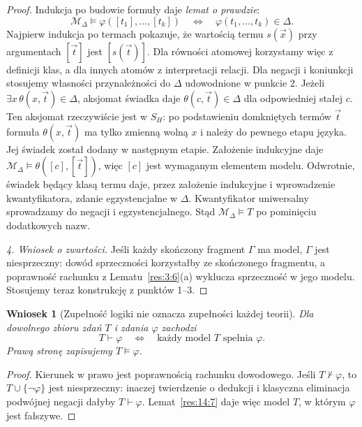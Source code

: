 \documentclass[11pt,a4paper]{article}
\numberwithin{equation}{section}
\theoremstyle{plain}
\newtheorem{wniosek}[twierdzenie]{Wniosek}
\theoremstyle{definition}
\theoremstyle{remark}
\begin{document}
\begin{proof}
Indukcja po budowie formuły daje \emph{lemat o prawdzie}:
\[
\mathcal M_\Delta\models\varphi([t_1],\ldots,[t_k])\quad\Longleftrightarrow\quad\varphi(t_1,\ldots,t_k)\in\Delta.
\]
Najpierw indukcja po termach pokazuje, że wartością termu $s(\vec x)$ przy argumentach $[\vec t]$ jest $[s(\vec t)]$. Dla równości atomowej korzystamy więc z definicji klas, a dla innych atomów z interpretacji relacji. Dla negacji i koniunkcji stosujemy własności przynależności do $\Delta$ udowodnione w punkcie 2. Jeżeli $\exists x\,\theta(x,\vec t)\in\Delta$, aksjomat świadka daje $\theta(c,\vec t)\in\Delta$ dla odpowiedniej stałej $c$. Ten aksjomat rzeczywiście jest w $S_H$: po podstawieniu domkniętych termów $\vec t$ formuła $\theta(x,\vec t)$ ma tylko zmienną wolną $x$ i należy do pewnego etapu języka. Jej świadek został dodany w następnym etapie. Założenie indukcyjne daje $\mathcal M_\Delta\models\theta([c],[\vec t])$, więc $[c]$ jest wymaganym elementem modelu. Odwrotnie, świadek będący klasą termu daje, przez założenie indukcyjne i wprowadzenie kwantyfikatora, zdanie egzystencjalne w $\Delta$. Kwantyfikator uniwersalny sprowadzamy do negacji i egzystencjalnego. Stąd $\mathcal M_\Delta\models T$ po pominięciu dodatkowych nazw.

\emph{4. Wniosek o zwartości.} Jeśli każdy skończony fragment $\Gamma$ ma model, $\Gamma$ jest niesprzeczny: dowód sprzeczności korzystałby ze skończonego fragmentu, a poprawność rachunku z Lematu~\ref{res:3:6}(a) wyklucza sprzeczność w jego modelu. Stosujemy teraz konstrukcję z punktów 1--3.
\end{proof}

\begin{wniosek}[Zupełność logiki nie oznacza zupełności każdej teorii]\label{res:14:8}
Dla dowolnego zbioru zdań $T$ i zdania $\varphi$ zachodzi
\[
T\vdash\varphi\quad\Longleftrightarrow\quad\text{każdy model $T$ spełnia $\varphi$}.
\]
Prawą stronę zapisujemy $T\models\varphi$.
\end{wniosek}
\begin{proof}
Kierunek w prawo jest poprawnością rachunku dowodowego. Jeśli $T\nvdash\varphi$, to $T\cup\{\neg\varphi\}$ jest niesprzeczny: inaczej twierdzenie o dedukcji i klasyczna eliminacja podwójnej negacji dałyby $T\vdash\varphi$. Lemat~\ref{res:14:7} daje więc model $T$, w którym $\varphi$ jest fałszywe.
\end{proof}
\end{document}
